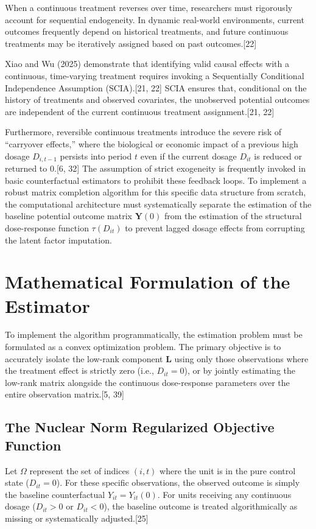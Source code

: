 \documentclass{article}
\begin{document}
When a continuous treatment reverses over time, researchers must rigorously account for sequential endogeneity. In dynamic real-world environments, current outcomes frequently depend on historical treatments, and future continuous treatments may be iteratively assigned based on past outcomes.[22] 

Xiao and Wu (2025) demonstrate that identifying valid causal effects with a continuous, time-varying treatment requires invoking a Sequentially Conditional Independence Assumption (SCIA).[21, 22] SCIA ensures that, conditional on the history of treatments and observed covariates, the unobserved potential outcomes are independent of the current continuous treatment assignment.[21, 22] 

Furthermore, reversible continuous treatments introduce the severe risk of ``carryover effects,'' where the biological or economic impact of a previous high dosage $D_{i, t-1}$ persists into period $t$ even if the current dosage $D_{it}$ is reduced or returned to $0$.[6, 32] The assumption of strict exogeneity is frequently invoked in basic counterfactual estimators to prohibit these feedback loops. To implement a robust matrix completion algorithm for this specific data structure from scratch, the computational architecture must systematically separate the estimation of the baseline potential outcome matrix $\mathbf{Y}(0)$ from the estimation of the structural dose-response function $\tau(D_{it})$ to prevent lagged dosage effects from corrupting the latent factor imputation.

\section{Mathematical Formulation of the Estimator}

To implement the algorithm programmatically, the estimation problem must be formulated as a convex optimization problem. The primary objective is to accurately isolate the low-rank component $\mathbf{L}$ using only those observations where the treatment effect is strictly zero (i.e., $D_{it} = 0$), or by jointly estimating the low-rank matrix alongside the continuous dose-response parameters over the entire observation matrix.[5, 39]

\subsection{The Nuclear Norm Regularized Objective Function}

Let $\Omega$ represent the set of indices $(i,t)$ where the unit is in the pure control state ($D_{it} = 0$). For these specific observations, the observed outcome is simply the baseline counterfactual $Y_{it} = Y_{it}(0)$. For units receiving any continuous dosage ($D_{it} > 0$ or $D_{it} < 0$), the baseline outcome is treated algorithmically as missing or systematically adjusted.[25] 
\end{document}
